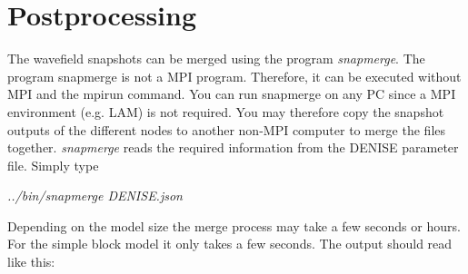 \section{Postprocessing}  
The wavefield snapshots can be merged using the program \textit{snapmerge}. The program snapmerge is not a MPI program. Therefore, it can be executed without MPI and the mpirun command. You can run snapmerge on any PC since a MPI environment (e.g. LAM) is not required. You may therefore copy the snapshot outputs of the different nodes to another non-MPI computer to merge the files together. \textit{snapmerge} reads the required information from the DENISE parameter file. Simply type
\newline

\textit{../bin/snapmerge DENISE.json  }
\newline


Depending on the model size the merge process may take a few seconds or hours. For the simple block model it only takes a few seconds. The output should read like this:
{\color{blue}{\begin{verbatim}
 pressure (files: ./snap/test.bin.p.??? ).

 writing merged snapshot file to  ./snap/test.bin.p
 Opening snapshot files: ./snap/test.bin.p.???  ... finished.
 Copying... ... finished.
 Use
 xmovie n1=100 n2=100 < ./snap/test.bin.p loop=1 label1=Y label2=X title=%g
 to play movie.
\end{verbatim}}} 
